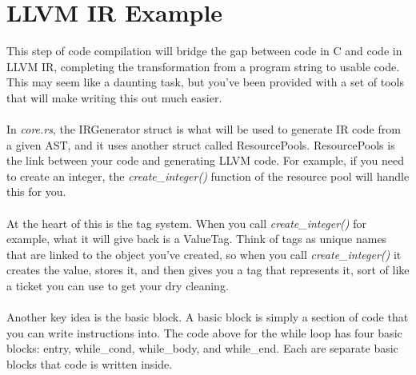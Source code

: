 \documentclass[
	12pt, %
]{fphw}
\begin{document}
\section*{LLVM IR Example}


This step of code compilation will bridge the gap between code in C and code in LLVM IR, completing the transformation from a program string to usable code. This may seem like a daunting task, but you've been provided with a set of tools that will make writing this out much easier.\\
\\
In \textit{core.rs}, the IRGenerator struct is what will be used to generate IR code from a given AST, and it uses another struct called ResourcePools. ResourcePools is the link between your code and generating LLVM code. For example, if you need to create an integer, the \textit{create\_integer()} function of the resource pool will handle this for you.\\
\\
At the heart of this is the tag system. When you call \textit{create\_integer()} for example, what it will give back is a ValueTag. Think of tags as unique names that are linked to the object you've created, so when you call \textit{create\_integer()} it creates the value, stores it, and then gives you a tag that represents it, sort of like a ticket you can use to get your dry cleaning.\\
\\
Another key idea is the basic block. A basic block is simply a section of code that you can write instructions into. The code above for the while loop has four basic blocks: entry, while\_cond, while\_body, and while\_end. Each are separate basic blocks that code is written inside.
\end{document}
